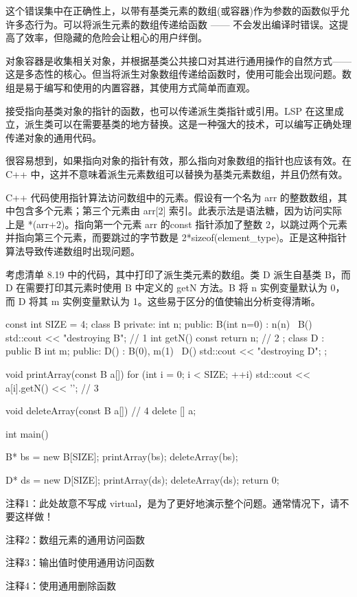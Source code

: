 这个错误集中在正确性上，以带有基类元素的数组(或容器)作为参数的函数似乎允许多态行为。可以将派生元素的数组传递给函数 —— 不会发出编译时错误。这提高了效率，但隐藏的危险会让粗心的用户绊倒。

对象容器是收集相关对象，并根据基类公共接口对其进行通用操作的自然方式——这是多态性的核心。但当将派生对象数组传递给函数时，使用可能会出现问题。数组是易于编写和使用的内置容器，其使用方式简单而直观。


接受指向基类对象的指针的函数，也可以传递派生类指针或引用。LSP 在这里成立，派生类可以在需要基类的地方替换。这是一种强大的技术，可以编写正确处理传递对象的通用代码。

很容易想到，如果指向对象的指针有效，那么指向对象数组的指针也应该有效。在 C++ 中，这并不意味着派生元素数组可以替换为基类元素数组，并且仍然有效。

C++ 代码使用指针算法访问数组中的元素。假设有一个名为 arr 的整数数组，其中包含多个元素；第三个元素由 arr[2] 索引。此表示法是语法糖，因为访问实际上是 *(arr+2)。指向第一个元素 arr 的const 指针添加了整数 2，以跳过两个元素并指向第三个元素，而要跳过的字节数是 2*sizeof(element\_type)。正是这种指针算法导致传递数组时出现问题。

考虑清单 8.19 中的代码，其中打印了派生类元素的数组。类 D 派生自基类 B，而 D 在需要打印其元素时使用 B 中定义的 getN 方法。B 将 n 实例变量默认为 0，而 D 将其 m 实例变量默认为 1。这些易于区分的值使输出分析变得清晰。


\begin{cpp}
const int SIZE = 4;
class B {
private:
  int n;
public:
  B(int n=0) : n(n) {}
  ~B() { std::cout << "destroying B\n"; } // 1
int getN() const { return n; } // 2
};
class D : public B {
  int m;
public:
  D() : B(0), m(1) {}
  ~D() { std::cout << "destroying D\n"; }
};

void printArray(const B a[]) {
  for (int i = 0; i < SIZE; ++i)
    std::cout << a[i].getN() << '\n'; // 3
}

void deleteArray(const B a[]) { // 4
  delete [] a;
}

int main() {
  B* bs = new B[SIZE];
  printArray(bs);
  deleteArray(bs);

  D* ds = new D[SIZE];
  printArray(ds);
  deleteArray(ds);
  return 0;
}
\end{cpp}

{\footnotesize
注释1：此处故意不写成 virtual，是为了更好地演示整个问题。通常情况下，请不要这样做！

注释2：数组元素的通用访问函数

注释3：输出值时使用通用访问函数

注释4：使用通用删除函数
}

